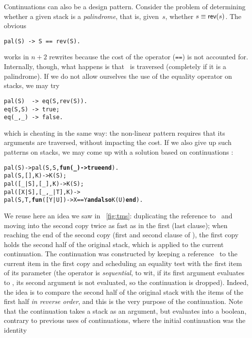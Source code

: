 Continuations can also be a design pattern. Consider the problem of
determining whether a given stack is a
\emph{palindrome}, that is, given~\(s\), whether
\(s \equiv \textsf{rev}(s)\). The obvious
\begin{verbatim}
pal(S) -> S == rev(S).
\end{verbatim}
works in \(n+2\) rewrites because the cost of the operator
(\texttt{==}) is not accounted for. Internally, though, what happens
is that ~is traversed (completely if it is a
palindrome). If we do not allow ourselves the use of the equality
operator on stacks, we may try
\begin{verbatim}
pal(S)  -> eq(S,rev(S)).
eq(S,S) -> true;
eq(_,_) -> false.
\end{verbatim}
which is cheating in the same way: the non\hyp{}linear pattern
  requires that its arguments are traversed, without impacting
the cost. If we also give up such patterns on stacks, we may come up
with a solution based on continuations \citep{DanvyGoldberg_2001}:
\begin{alltt}
pal(S)               -> pal(S,S,\textbf{fun(\_) -> true end}).
pal(    S,     [],K) -> K(S);\hfill% \emph{Even length}
pal([\_|S],    [\_],K) -> K(S);\hfill% \emph{Odd length}
pal([X|S],[\_,\_|T],K) ->
\hfill{}pal(S,T,\textbf{fun}([Y|U]) -> X == Y \textbf{andalso} K(U) \textbf{end}).
\end{alltt}
We reuse here an idea we saw in \fig~\vref{fig:tms}: duplicating the
reference to~ and moving into the second copy twice as fast
as in the first (last clause); when reaching the end of the second
copy (first and second clause of ), the first copy
holds the second half of the original stack, which is applied to the
current continuation. The continuation was constructed by keeping a
reference~ to the current item in the first copy and
scheduling an equality test with the first item of its parameter (the
operator  is \emph{sequential}, to wit, if its first
argument evaluates to , its second argument is not
evaluated, so the continuation is dropped). Indeed, the idea is to
compare the second half of the original stack with the items of the
first half \emph{in reverse order}, and this is the very purpose of
the continuation. Note that the continuation takes a stack as an
argument, but evaluates into a boolean, contrary to previous uses of
continuations, where the initial continuation was the identity
